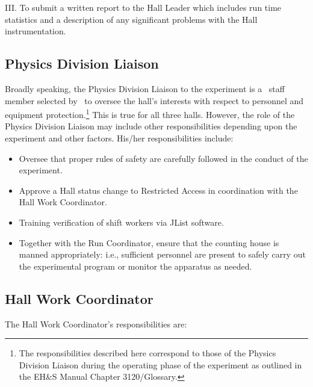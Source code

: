 \documentclass[11pt]{article}
\begin{document}
\noindent III. To submit a written report to the Hall Leader which includes
run time statistics and a description of any significant problems with the 
Hall instrumentation.


\subsection{Physics Division Liaison}

Broadly speaking, the Physics Division Liaison to the experiment 
is a \HALL\ staff member selected by \HALLLEADER\
to oversee the hall's interests with respect to personnel and equipment 
protection.\footnote{The responsibilities described here correspond 
to those of the Physics Division Liaison during
the operating phase of the experiment as outlined in the
EH\&S Manual Chapter 3120/Glossary.} 
This is true for all three halls. However, the role of
the Physics Division Liaison may include other responsibilities
depending upon the experiment and other factors. His/her responsibilities
include:
\begin{itemize}
\item Oversee that proper rules of safety are carefully followed in the 
conduct of the experiment.
\item Approve a Hall status change to Restricted Access in coordination
with the Hall Work Coordinator.
\item Training verification of shift workers via JList software.
\item Together with the Run Coordinator, 
ensure that the counting house is manned appropriately: i.e.,
sufficient personnel are present to safely carry out the experimental 
program or monitor the apparatus as needed.
\end{itemize}  

\subsection{Hall Work Coordinator}

The Hall Work Coordinator's responsibilities are: 
\end{document}
